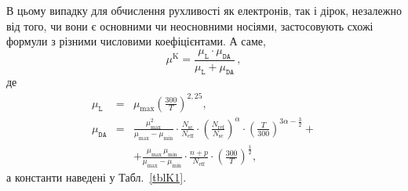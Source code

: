 \documentclass[fleqn,twoside,twocolumn,nofootinbib,showkeys]{revtex4} %
\begin{document}
В цьому випадку \cite{KLAASSEN953} для обчислення рухливості як електронів, так і дірок,
незалежно від того, чи вони є основними чи неосновними носіями,
застосовують схожі формули з різними числовими коефіцієнтами.
А саме,
\begin{equation}\label{eqK1}
  \mu^\mathrm{K}=\frac{\mu_\mathtt{L}\cdot\mu_\mathtt{DA}}{\mu_\mathtt{L}+\mu_\mathtt{DA}}\,,
\end{equation}
де
\begin{eqnarray}
  \label{eqK2}
  \mu_\mathtt{L} &=&  \mu_\mathrm{max} \left(\frac{300}{T}\right)^{2,25},\, \\
  \mu_\mathtt{DA}  &=& \frac{\mu_\mathrm{max}^2}{\mu_\mathrm{max} - \mu_\mathrm{min}} \cdot
    \frac{N_\mathrm{sc}}{N_\mathrm{eff}} \cdot \left(\frac{N_\mathrm{ref}}{N_\mathrm{sc}}\right)^{\alpha} \cdot \left(\frac{T}{300}\right)^{3\alpha - \frac{3}{2}}+\nonumber\\
    \label{eqK3}
    &&+ \frac{\mu_\mathrm{max} \, \mu_\mathrm{min}}{\mu_\mathrm{max} - \mu_\mathrm{min}} \cdot \frac{n + p}{N_\mathrm{eff}} \cdot \left(\frac{300}{T}\right)^\frac{1}{2},\,
\end{eqnarray}
а константи наведені у Табл.~\ref{tblK1}.

\begin{table}
\caption{Коефіцієнти для розрахунку рухливості відповідно до моделі Klaassen, формули (\ref{eqK2})-(\ref{eqK3})}
\label{tblK1}
\vspace{2mm}
\centering
{}
\end{table}
\end{document}
